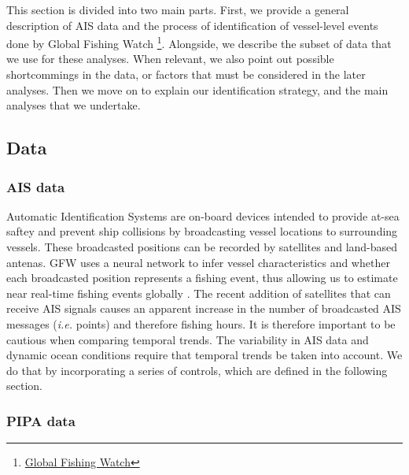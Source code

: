 \documentclass[]{article}
\let\rmarkdownfootnote\footnote%
\def\footnote{\protect\rmarkdownfootnote}
\begin{document}
This section is divided into two main parts. First, we provide a general
description of AIS data and the process of identification of
vessel-level events done by Global Fishing Watch \footnote{\href{globalfishingwatch.org}{Global
  Fishing Watch}}. Alongside, we describe the subset of data that we use
for these analyses. When relevant, we also point out possible
shortcommings in the data, or factors that must be considered in the
later analyses. Then we move on to explain our identification strategy,
and the main analyses that we undertake.

\subsection{Data}\label{data}

\subsubsection{AIS data}\label{ais-data}

Automatic Identification Systems are on-board devices intended to
provide at-sea saftey and prevent ship collisions by broadcasting vessel
locations to surrounding vessels. These broadcasted positions can be
recorded by satellites and land-based antenas. GFW uses a neural network
to infer vessel characteristics and whether each broadcasted position
represents a fishing event, thus allowing us to estimate near real-time
fishing events globally \citep{kroodsma_2018}. The recent addition of
satellites that can receive AIS signals causes an apparent increase in
the number of broadcasted AIS messages (\emph{i.e.} points) and
therefore fishing hours. It is therefore important to be cautious when
comparing temporal trends. The variability in AIS data and dynamic ocean
conditions require that temporal trends be taken into account. We do
that by incorporating a series of controls, which are defined in the
following section.

\subsubsection{PIPA data}\label{pipa-data}
\end{document}
